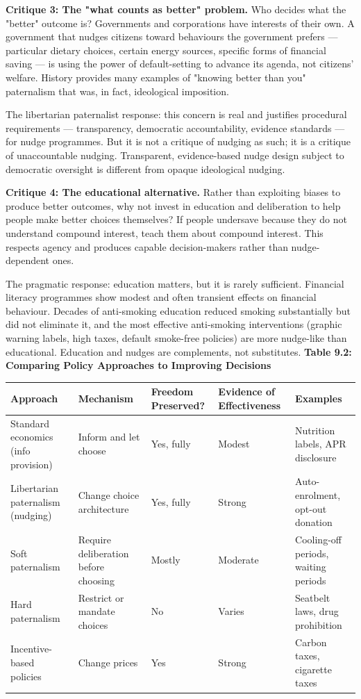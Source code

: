 \documentclass[12pt, letterpaper]{article}
\begin{document}
\textbf{Critique 3: The "what counts as better" problem.} Who decides what the "better" outcome is? Governments and corporations have interests of their own. A government that nudges citizens toward behaviours the government prefers --- particular dietary choices, certain energy sources, specific forms of financial saving --- is using the power of default-setting to advance its agenda, not citizens' welfare. History provides many examples of "knowing better than you" paternalism that was, in fact, ideological imposition.

The libertarian paternalist response: this concern is real and justifies procedural requirements --- transparency, democratic accountability, evidence standards --- for nudge programmes. But it is not a critique of nudging as such; it is a critique of unaccountable nudging. Transparent, evidence-based nudge design subject to democratic oversight is different from opaque ideological nudging.

\textbf{Critique 4: The educational alternative.} Rather than exploiting biases to produce better outcomes, why not invest in education and deliberation to help people make better choices themselves? If people undersave because they do not understand compound interest, teach them about compound interest. This respects agency and produces capable decision-makers rather than nudge-dependent ones.

The pragmatic response: education matters, but it is rarely sufficient. Financial literacy programmes show modest and often transient effects on financial behaviour. Decades of anti-smoking education reduced smoking substantially but did not eliminate it, and the most effective anti-smoking interventions (graphic warning labels, high taxes, default smoke-free policies) are more nudge-like than educational. Education and nudges are complements, not substitutes.
\newpage
\textbf{Table 9.2: Comparing Policy Approaches to Improving Decisions}


\begin{table}[H]
\centering
\small
\begin{tabularx}{\linewidth}{lYYYY}
\toprule
Approach & Mechanism & Freedom Preserved? & Evidence of Effectiveness & Examples \\
\midrule
Standard economics (info provision) & Inform and let choose & Yes, fully & Modest & Nutrition labels, APR disclosure \\
Libertarian paternalism (nudging) & Change choice architecture & Yes, fully & Strong & Auto-enrolment, opt-out donation \\
Soft paternalism & Require deliberation before choosing & Mostly & Moderate & Cooling-off periods, waiting periods \\
Hard paternalism & Restrict or mandate choices & No & Varies & Seatbelt laws, drug prohibition \\
Incentive-based policies & Change prices & Yes & Strong & Carbon taxes, cigarette taxes \\
\bottomrule
\end{tabularx}
\end{table}
\end{document}
